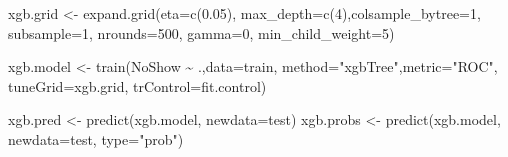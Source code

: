 \documentclass[
]{article}
\newenvironment{Shaded}{\begin{snugshade}}{\end{snugshade}}
\newcommand{\AttributeTok}[1]{\textcolor[rgb]{0.77,0.63,0.00}{#1}}
\newcommand{\DecValTok}[1]{\textcolor[rgb]{0.00,0.00,0.81}{#1}}
\newcommand{\FloatTok}[1]{\textcolor[rgb]{0.00,0.00,0.81}{#1}}
\newcommand{\FunctionTok}[1]{\textcolor[rgb]{0.00,0.00,0.00}{#1}}
\newcommand{\NormalTok}[1]{#1}
\newcommand{\OtherTok}[1]{\textcolor[rgb]{0.56,0.35,0.01}{#1}}
\newcommand{\SpecialCharTok}[1]{\textcolor[rgb]{0.00,0.00,0.00}{#1}}
\newcommand{\StringTok}[1]{\textcolor[rgb]{0.31,0.60,0.02}{#1}}
\begin{document}
\begin{Shaded}
\begin{Highlighting}[]
\NormalTok{xgb.grid }\OtherTok{\textless{}{-}} \FunctionTok{expand.grid}\NormalTok{(}\AttributeTok{eta=}\FunctionTok{c}\NormalTok{(}\FloatTok{0.05}\NormalTok{),}
                       \AttributeTok{max\_depth=}\FunctionTok{c}\NormalTok{(}\DecValTok{4}\NormalTok{),}\AttributeTok{colsample\_bytree=}\DecValTok{1}\NormalTok{,}
                       \AttributeTok{subsample=}\DecValTok{1}\NormalTok{, }\AttributeTok{nrounds=}\DecValTok{500}\NormalTok{, }\AttributeTok{gamma=}\DecValTok{0}\NormalTok{, }\AttributeTok{min\_child\_weight=}\DecValTok{5}\NormalTok{)}

\NormalTok{xgb.model }\OtherTok{\textless{}{-}} \FunctionTok{train}\NormalTok{(NoShow }\SpecialCharTok{\textasciitilde{}}\NormalTok{ .,}\AttributeTok{data=}\NormalTok{train, }\AttributeTok{method=}\StringTok{"xgbTree"}\NormalTok{,}\AttributeTok{metric=}\StringTok{"ROC"}\NormalTok{,}
                  \AttributeTok{tuneGrid=}\NormalTok{xgb.grid, }\AttributeTok{trControl=}\NormalTok{fit.control)}

\NormalTok{xgb.pred }\OtherTok{\textless{}{-}} \FunctionTok{predict}\NormalTok{(xgb.model, }\AttributeTok{newdata=}\NormalTok{test)}
\NormalTok{xgb.probs }\OtherTok{\textless{}{-}} \FunctionTok{predict}\NormalTok{(xgb.model, }\AttributeTok{newdata=}\NormalTok{test, }\AttributeTok{type=}\StringTok{"prob"}\NormalTok{)}
\end{Highlighting}
\end{Shaded}

\begin{Shaded}
\end{Shaded}
\end{document}
